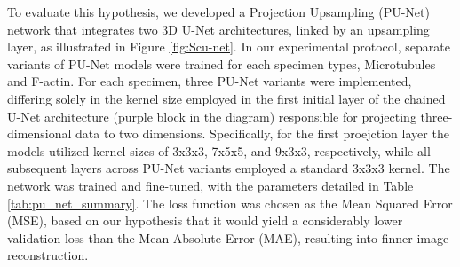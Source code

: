 \documentclass[11pt,
  paper=a4, 
  bibliography=totocnumbered,
	captions=tableheading,
	BCOR=10mm
]{scrreprt}
\theoremstyle{definition}
\newcommand{\figureref}[1]{Figure \ref{#1}}
\newcommand{\tableref}[1]{Table \ref{#1}}
\begin{document}
\vspace{1cm}
\noindent
To evaluate this hypothesis, we developed a Projection Upsampling (PU-Net) network that integrates two 3D U-Net architectures, 
linked by an upsampling layer, as illustrated in \figureref{fig:Scu-net}. In our experimental protocol, separate variants of PU-Net models
 were trained for each specimen types, Microtubules and F-actin. For each specimen, three PU-Net variants were implemented, 
 differing solely in the kernel size employed in the first initial layer of the chained U-Net architecture (purple block in the diagram) responsible for projecting 
 three-dimensional data to two dimensions. Specifically, for the first proejction layer the models utilized kernel sizes of 3x3x3, 7x5x5, and 9x3x3, respectively, 
 while all subsequent layers across PU-Net variants employed a standard 3x3x3 kernel. The network was trained and fine-tuned, with the parameters detailed in \tableref{tab:pu_net_summary}. 
 The loss function was chosen as the Mean Squared Error (MSE), based on our hypothesis that it would yield a considerably lower validation loss than the Mean Absolute Error (MAE), resulting into finner image reconstruction.


 





 

\end{document}
